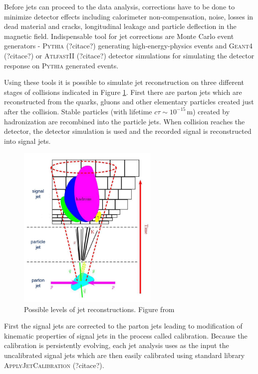 Before jets can proceed to the data analysis, corrections have to be done to
minimize detector effects including calorimeter non-compensation, noise, losses
in dead material and cracks, longitudinal leakage and particle deflection in the
magnetic field. Indispensable tool for jet corrections are Monte Carlo event
generators - \textsc{Pythia} (?citace?) generating high-energy-physics events and 
\textsc{Geant4} (?citace?) or \textsc{AtlfastII} (?citace?) detector simulations
for simulating the detector response on \textsc{Pythia} generated events.

Using these tools it is possible to simulate jet reconstruction on three
different stages of collisions indicated in Figure \ref{fig:JetPhases}. First
there are parton jets which are reconstructed from the quarks, gluons and other
elementary particles created just after the collision. Stable particles (with
lifetime $c\tau \sim 10^{-15}\,\text{m}$) created by hadronization are recombined into
the particle jets. When collision reaches the detector, the detector simulation
is used and the recorded signal is reconstructed into signal jets.

\begin{figure}
  \centering
  \includegraphics[width=0.6\textwidth]{Chapter2/JetPhases.jpg}
  \caption{Possible levels of jet reconstructions. Figure from \cite{DZero:JetEnergyScale} }
  \label{fig:JetPhases}
\end{figure}

First the signal jets are corrected to the parton jets leading to modification
of kinematic properties of signal jets in the process called calibration.
Because the calibration is persistently evolving, each jet analysis uses as the
input the uncalibrated signal jets which are then easily calibrated using
standard library \textsc{ApplyJetCalibration} (?citace?).

